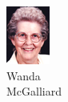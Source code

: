 \begin{figure}[H]
\begin{subfigure}[b]{0.1\textwidth}
                \includegraphics[width=\textwidth]{mugs/McGalliardWanda}
                \caption*{Wanda \\ McGalliard}
        \end{subfigure}
        ~ %
        \begin{subfigure}[b]{0.1\textwidth}

\end{subfigure}
\end{figure}
